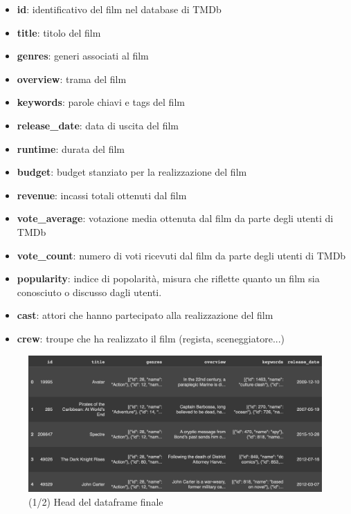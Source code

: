 \documentclass{report}
\begin{document}
        \begin{itemize}
            \item \textbf{id}: identificativo del film nel database di TMDb
            \item \textbf{title}: titolo del film
            \item \textbf{genres}: generi associati al film
            \item \textbf{overview}: trama del film
            \item \textbf{keywords}: parole chiavi e tags del film
            \item \textbf{release\_date}: data di uscita del film
            \item \textbf{runtime}: durata del film
            \item \textbf{budget}: budget stanziato per la realizzazione del film
            \item \textbf{revenue}: incassi totali ottenuti dal film 
            \item \textbf{vote\_average}: votazione media ottenuta dal film da parte degli utenti di TMDb
            \item \textbf{vote\_count}: numero di voti ricevuti dal film da parte degli utenti di TMDb
            \item \textbf{popularity}: indice di popolarità, misura che riflette quanto un film sia conosciuto o discusso dagli utenti. 
            \item \textbf{cast}: attori che hanno partecipato alla realizzazione del film
            \item \textbf{crew}: troupe che ha realizzato il film (regista, sceneggiatore...) 
        \end{itemize}
        \begin{figure}[h]
            \centering
            \includegraphics[width=1\linewidth]{screenshot/movies.head1.png}
            \caption{(1/2) Head del dataframe finale}
            \label{fig:enter-label}
        \end{figure}
\end{document}
